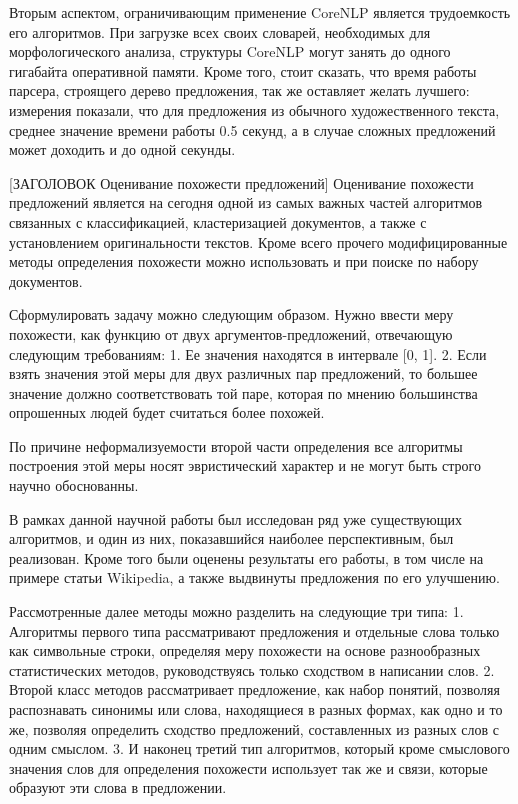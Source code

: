 Вторым аспектом, ограничивающим применение CoreNLP является трудоемкость
его алгоритмов. При загрузке всех своих словарей, необходимых для морфологического
анализа, структуры CoreNLP могут занять до одного гигабайта оперативной памяти.
Кроме того, стоит сказать, что время работы парсера, строящего дерево предложения,
так же оставляет желать лучшего: измерения показали, что для предложения
из обычного художественного текста, среднее значение времени работы 0.5 секунд,
а в случае сложных предложений может доходить и до одной секунды.

[ЗАГОЛОВОК Оценивание похожести предложений]
Оценивание похожести предложений является на сегодня одной из самых важных
частей алгоритмов связанных с классификацией, кластеризацией документов, а также
с установлением оригинальности текстов. Кроме всего прочего модифицированные методы определения
похожести можно использовать и при поиске по набору документов.

Сформулировать задачу можно следующим образом. Нужно ввести меру похожести,
как функцию от двух аргументов-предложений, отвечающую следующим требованиям:
1. Ее значения находятся в интервале [0, 1].
2. Если взять значения этой меры для двух различных пар предложений, 
то большее значение должно соответствовать той паре, которая по мнению
большинства опрошенных людей будет считаться более похожей.

По причине неформализуемости второй части определения все алгоритмы 
построения этой меры носят эвристический характер и не могут быть строго научно обоснованны.

В рамках данной научной работы был исследован ряд уже существующих алгоритмов,
и один из них, показавшийся наиболее перспективным, был реализован.
Кроме того были оценены результаты его работы, в том числе на примере статьи Wikipedia, 
а также выдвинуты предложения по его улучшению.

Рассмотренные далее методы можно разделить на следующие три типа:
1. Алгоритмы первого типа\cite{statisticalSim} рассматривают предложения и отдельные слова только как символьные строки, 
определяя меру похожести на основе разнообразных статистических методов, руководствуясь только сходством в написании слов.
2. Второй класс методов\cite{wordnetSim} рассматривает предложение, как набор понятий, позволяя распознавать синонимы 
или слова, находящиеся в разных формах, как одно и то же, позволяя определить сходство предложений, 
составленных из разных слов с одним смыслом.
3. И наконец третий тип алгоритмов\cite{weightedDep}\cite{complexSim}, который кроме смыслового значения слов для определения похожести
использует так же и связи, которые образуют эти слова в предложении.


